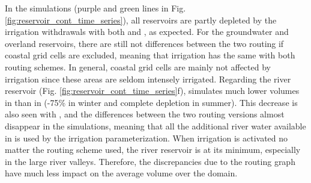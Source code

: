 In the \irr simulations (purple and green lines in Fig. \ref{fig:reservoir_cont_time_series}), all reservoirs are partly depleted by the irrigation withdrawals with both \std and \native, as expected. 
For the groundwater and overland reservoirs, there are still not differences between the two routing if coastal grid cells are excluded, meaning that irrigation has the same with both routing schemes. In general, coastal grid cells are mainly not affected by irrigation since these areas are seldom intensely irrigated.
Regarding the river reservoir (Fig. \ref{fig:reservoir_cont_time_series}f), \std simulates much lower volumes in \irr than in \noirr (-75\% in winter and complete depletion in summer). This decrease is also seen with \native, and the differences between the two routing versions almost disappear in the  \irr simulations, meaning that all the additional river water available in \std is used by the irrigation parameterization. 
When irrigation is activated no matter the routing scheme used, the river reservoir is at its minimum, especially in the large river valleys. Therefore, the discrepancies due to the routing graph have much less impact on the average volume over the domain.

